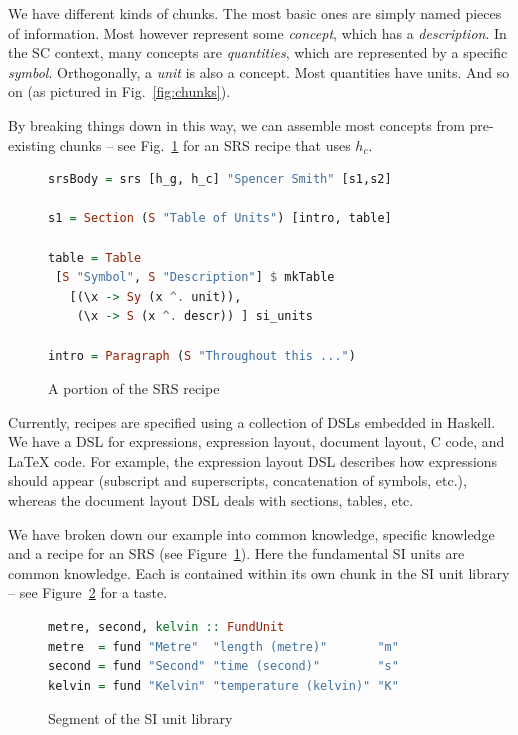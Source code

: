 \documentclass{sig-alternate-05-2015}
\begin{document}
We have different kinds of chunks.  The most basic ones are simply named pieces
of information.  Most however represent some \emph{concept}, which has a
\emph{description}.  In the SC context, many concepts are \emph{quantities},
which are represented by a specific \emph{symbol}.  Orthogonally, a \emph{unit}
is also a concept.  Most quantities have units.  And so on (as pictured
in Fig.~\ref{fig:chunks}).

By breaking things down in this way, we can assemble most concepts from
pre-existing chunks -- see Fig.~\ref{fig:recipe} for an SRS recipe that
uses $h_c$.

\begin{figure}[tb]
\begin{lstlisting}[language=Haskell, frame=single, 
  showstringspaces=false, basicstyle=\scriptsize]
srsBody = srs [h_g, h_c] "Spencer Smith" [s1,s2]

s1 = Section (S "Table of Units") [intro, table]

table = Table 
 [S "Symbol", S "Description"] $ mkTable
   [(\x -> Sy (x ^. unit)),
    (\x -> S (x ^. descr)) ] si_units

intro = Paragraph (S "Throughout this ...")
\end{lstlisting}
\caption{A portion of the SRS recipe}
\label{fig:recipe}
\end{figure}

Currently, recipes are specified using a collection of DSLs embedded in
Haskell.  We have a DSL for expressions, expression layout, document
layout, C code, and LaTeX code.  For example, the expression layout DSL
describes how expressions should appear (subscript and
superscripts, concatenation of symbols, etc.), whereas the document layout
DSL deals with sections, tables, etc.

We have broken down our example into common knowledge, specific knowledge
and a recipe for an SRS (see Figure~\ref{fig:recipe}).
Here the fundamental SI units are common knowledge. Each is
contained within its own chunk in the SI unit library -- see
Figure~\ref{fig:know_common} for a taste.

\begin{figure}[thb]
\begin{lstlisting}[language=Haskell, frame=single, showstringspaces=false, 
  basicstyle=\scriptsize]
metre, second, kelvin :: FundUnit
metre  = fund "Metre"  "length (metre)"       "m"
second = fund "Second" "time (second)"        "s"
kelvin = fund "Kelvin" "temperature (kelvin)" "K"
\end{lstlisting}
\caption{Segment of the SI unit library}
\label{fig:know_common}
\end{figure}
\end{document}
